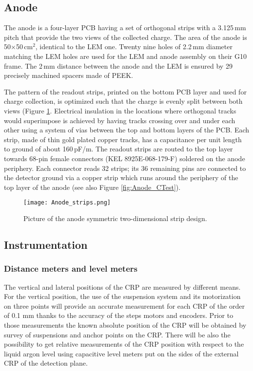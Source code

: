 \subsection{Anode}
\label{sec:fddp-crp-anode}
 

The anode is a four-layer PCB having a set of orthogonal strips with a 3.125\,mm pitch that provide the two views of the collected charge. The area of the anode is 50$\times$50\,cm$^2$, identical to the LEM one. Twenty nine holes of 2.2\,mm diameter matching the LEM holes are used for the LEM and anode assembly on their G10 frame. The 2\,mm distance between the anode and the LEM is ensured by 29 precisely machined spacers made of PEEK.

The pattern of the readout strips, printed on the bottom PCB layer and used for charge collection, is optimized such that the charge is evenly split between both views (Figure \ref{fig:Anode}. Electrical insulation in the locations where orthogonal tracks would superimpose is achieved by having tracks crossing over and under each other using a system of vias between the top and bottom layers of the PCB. Each strip, made of thin gold plated copper tracks, has a capacitance per unit length to ground of about 
160\,pF/m. The readout strips are routed to the top layer towards 68-pin female connectors (KEL 8925E-068-179-F) soldered on the anode periphery. Each connector reads 32 strips; its 36 remaining pins are connected to the detector ground via a copper strip which runs around the periphery of the top layer of the anode (see also Figure \ref{fig:Anode_CTest}). 

\begin{figure}[h!]
  \centering
  \texttt{[image: Anode\_strips.png]}
  \caption{Picture of the anode symmetric two-dimensional strip design.}
  \label{fig:Anode} 
\end{figure}

\subsection{Instrumentation}
\label{sec:fddp-crp-instr}

\subsubsection{Distance meters and level meters}
The vertical and lateral positions of the CRP are measured by different means. 
For the vertical position, the use of the suspension system and its motorization on three points will provide an accurate measurement for each CRP of the order of 0.1 mm thanks to the accuracy of the steps motors and encoders. Prior to those measurements the known absolute position of the CRP will be obtained by survey of suspensions and anchor points on the CRP. There will be also the possibility to get relative measurements of the CRP position with respect to the liquid argon level using capacitive level meters put on the sides of the  external CRP of the detection plane. 

